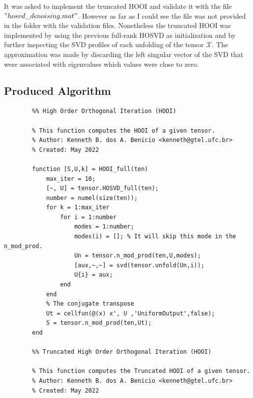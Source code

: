 \documentclass[a4paper,10pt]{article}
\begin{document}
    It was asked to implement the truncated HOOI and validate it with the file $"hosvd\_denoising.mat"$. However as far as I could see the file was not provided in the folder with the validation files.
    Nonetheless the truncated HOOI was implemented by using the previous full-rank HOSVD as initialization and by further inspecting the SVD profiles of each unfolding of the tensor $\mathcal{X}$. The approximation was made by discarding the left singular vector of the SVD
    that were associated with eigenvalues which values were close to zero. 

    \newpage
    \subsection*{Produced Algorithm}

    \begin{verbatim}
        %% High Order Orthogonal Iteration (HOOI)

        % This function computes the HOOI of a given tensor.   
        % Author: Kenneth B. dos A. Benicio <kenneth@gtel.ufc.br>
        % Created: May 2022

        function [S,U,k] = HOOI_full(ten)
            max_iter = 10;
            [~, U] = tensor.HOSVD_full(ten);
            number = numel(size(ten));
            for k = 1:max_iter
                for i = 1:number
                    modes = 1:number;
                    modes(i) = []; % It will skip this mode in the n_mod_prod.
                    Un = tensor.n_mod_prod(ten,U,modes);
                    [aux,~,~] = svd(tensor.unfold(Un,i));
                    U{i} = aux;
                end
            end
            % The conjugate transpose
            Ut = cellfun(@(x) x', U ,'UniformOutput',false);
            S = tensor.n_mod_prod(ten,Ut); 
        end

        %% Truncated High Order Orthogonal Iteration (HOOI)

        % This function computes the Truncated HOOI of a given tensor.   
        % Author: Kenneth B. dos A. Benicio <kenneth@gtel.ufc.br>
        % Created: May 2022


\end{verbatim}
\end{document}
